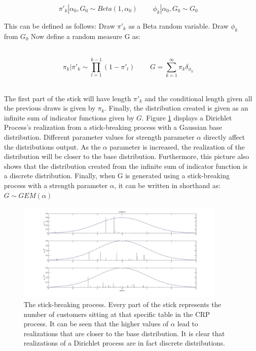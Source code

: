 \documentclass [twoside,hidelinks]{article}
\begin{document}
  \begin{equation}
\pi'_k  | \alpha_0, G_0 \sim Beta (1, \alpha_0)\ \ \ \ \ \ \ \ \ \   \phi_k | \alpha_0, G_0 \sim G_0
\end{equation}



This can be defined as follows: Draw $\pi'_k$ as a Beta random variable. Draw $\phi_k$ from $G_0$ Now define a random measure G as:


\ \
\begin{equation}
\pi_k  | \pi'_k \sim \prod_{l=1}^{k-1} (1- \pi'_l) \ \ \ \ \ \ \ \ \ \     G = \sum_{k=1}^\infty \pi_k \delta_{\phi_k} 
\end{equation}
\ \

The first part of the stick will have length $\pi'_k$ and the conditional length given all the previous draws is given by $\pi_k$. Finally, the distribution created is given as an infinite sum of indicator functions given by $G$. Figure \ref{crpGausBase} displays a Dirichlet Process's realization from a stick-breaking process with a Gaussian base distribution. Different parameter values for strength parameter $\alpha$ directly affect the distributions output. As the $\alpha$ parameter is increased, the realization of the distribution will be closer to the base distribution. Furthermore, this picture also shows that the distribution created from the infinite sum of indicator function is a discrete distribution. Finally, when G is generated using a stick-breaking process with a strength parameter $\alpha$, it can be written in shorthand as: $ G \sim GEM (\alpha) $

\begin{figure} [h!]
          \centerline{\includegraphics [width=0.91\textwidth]{stickBreakGaus}}
	\caption{The stick-breaking process. Every part of the stick represents the number of customers sitting at that specific table in the CRP process. It can be seen that the higher values of $\alpha$ lead to realizations that are closer to the base distribution. It is clear that realizations of a Dirichlet process are in fact discrete distributions.}
	\label{crpGausBase}
\end{figure}
\end{document}

